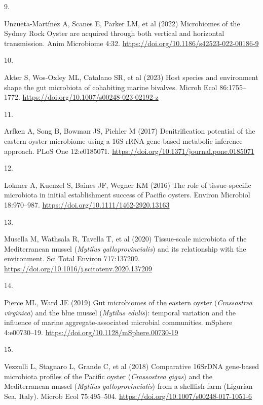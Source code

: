 \documentclass[
  12 pt,
]{article}
\newlength{\cslhangindent}
\newlength{\csllabelwidth}
\newenvironment{CSLReferences}[2] %
 {\begin{list}{}{%
  \setlength{\itemindent}{0pt}
  \setlength{\leftmargin}{0pt}
  \setlength{\parsep}{0pt}
  \ifodd #1
   \setlength{\leftmargin}{\cslhangindent}
   \setlength{\itemindent}{-1\cslhangindent}
  \fi
  \setlength{\itemsep}{#2\baselineskip}}}
 {\end{list}}
\newcommand{\CSLLeftMargin}[1]{\parbox[t]{\csllabelwidth}{\strut#1\strut}}
\newcommand{\CSLRightInline}[1]{\parbox[t]{\linewidth - \csllabelwidth}{\strut#1\strut}}
\begin{document}
\begin{CSLReferences}{0}{0}
\CSLLeftMargin{9. }%
\CSLRightInline{Unzueta-Martínez A, Scanes E, Parker LM, et al (2022) Microbiomes of the {Sydney Rock Oyster} are acquired through both vertical and horizontal transmission. Anim Microbiome 4:32. \url{https://doi.org/10.1186/s42523-022-00186-9}}

\CSLLeftMargin{10. }%
\CSLRightInline{Akter S, Wos-Oxley ML, Catalano SR, et al (2023) Host species and environment shape the gut microbiota of cohabiting marine bivalves. Microb Ecol 86:1755--1772. \url{https://doi.org/10.1007/s00248-023-02192-z}}

\CSLLeftMargin{11. }%
\CSLRightInline{Arfken A, Song B, Bowman JS, Piehler M (2017) Denitrification potential of the eastern oyster microbiome using a {16S rRNA} gene based metabolic inference approach. PLoS One 12:e0185071. \url{https://doi.org/10.1371/journal.pone.0185071}}

\CSLLeftMargin{12. }%
\CSLRightInline{Lokmer A, Kuenzel S, Baines JF, Wegner KM (2016) The role of tissue-specific microbiota in initial establishment success of {Pacific} oysters. Environ Microbiol 18:970--987. \url{https://doi.org/10.1111/1462-2920.13163}}

\CSLLeftMargin{13. }%
\CSLRightInline{Musella M, Wathsala R, Tavella T, et al (2020) Tissue-scale microbiota of the {Mediterranean} mussel ({{\emph{Mytilus galloprovincialis}}}) and its relationship with the environment. Sci Total Environ 717:137209. \url{https://doi.org/10.1016/j.scitotenv.2020.137209}}

\CSLLeftMargin{14. }%
\CSLRightInline{Pierce ML, Ward JE (2019) Gut microbiomes of the eastern oyster ({{\emph{Crassostrea virginica}}}) and the blue mussel ({{\emph{Mytilus edulis}}}): temporal variation and the influence of marine aggregate-associated microbial communities. mSphere 4:e00730--19. \url{https://doi.org/10.1128/mSphere.00730-19}}

\CSLLeftMargin{15. }%
\CSLRightInline{Vezzulli L, Stagnaro L, Grande C, et al (2018) Comparative {16SrDNA} gene-based microbiota profiles of the {Pacific} oyster ({{\emph{Crassostrea}}}{{\emph{ gigas}}}) and the {Mediterranean} mussel ({{\emph{Mytilus}}}{{\emph{ galloprovincialis}}}) from a shellfish farm ({Ligurian Sea}, {Italy}). Microb Ecol 75:495--504. \url{https://doi.org/10.1007/s00248-017-1051-6}}


\end{CSLReferences}
\end{document}
